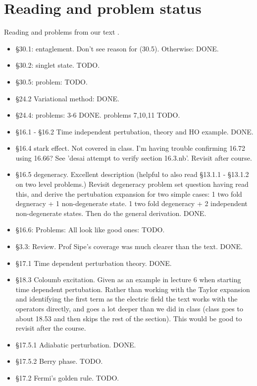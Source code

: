 \chapter{Reading and problem status}

Reading and problems from our text \cite{desai2009quantum}.

\begin{itemize}
\item \S 30.1: entaglement.  Don't see reason for (30.5).  Otherwise: DONE.
\item \S 30.2: singlet state.  TODO.
\item \S 30.5: problem: TODO.
\item \S 24.2 Variational method: DONE.
\item \S 24.4: problems: 3-6 DONE.  problems 7,10,11 TODO.
\item \S 16.1 - \S 16.2 Time independent pertubation, theory and HO example.  DONE.
\item \S 16.4 stark effect.  Not covered in class.  I'm having trouble confirming 16.72 using 16.66?  See 'desai attempt to verify section 16.3.nb'.  Revisit after course.
\item \S 16.5 degeneracy.  Excellent description (helpful to also read \S 13.1.1 - \S 13.1.2 on two level problems.)  Revisit degeneracy problem set question having read this, and derive the pertubation expansion for two simple cases: 1 two fold degneracy + 1 non-degenerate state.  1 two fold degeneracy + 2 independent non-degenerate states.  Then do the general derivation.  DONE.
\item \S 16.6: Problems: All look like good ones: TODO.
\item \S 3.3: Review.  Prof Sipe's coverage was much clearer than the text.  DONE.
\item \S 17.1 Time dependent perturbation theory.  DONE.
\item \S 18.3 Coloumb excitation.  Given as an example in lecture 6 when starting time dependent pertubation.  Rather than working with the Taylor expansion and identifying the first term as the electric field the text works with the operators directly, and goes a lot deeper than we did in class (class goes to about 18.53 and then skips the rest of the section).  This would be good to revisit after the course.
\item \S 17.5.1 Adiabatic perturbation.  DONE.
\item \S 17.5.2 Berry phase. TODO.
\item \S 17.2 Fermi's golden rule. TODO.

\end{itemize}
